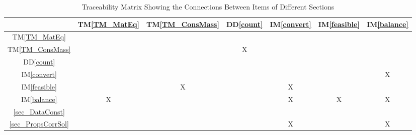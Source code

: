 \documentclass[12pt]{article}
\newcommand{\ddref}[1]{DD\ref{#1}}
\newcommand{\tmref}[1]{TM\ref{#1}}
\newcommand{\iref}[1]{IM\ref{#1}}
\begin{document}
\begin{table}[h!]
  \centering
  \begin{tabular}{|c|c|c|c|c|c|c|}
    \hline
                           & \tmref{TM_MatEq} & \tmref{TM_ConsMass} & \ddref{count} & \iref{convert} & \iref{feasible} & \iref{balance} \\
    \hline
    \tmref{TM_MatEq}       &                  &                     &               &                &                 &                \\ \hline
    \tmref{TM_ConsMass}    &                  &                     & X             &                &                 &                \\ \hline
    \ddref{count}          &                  &                     &               &                &                 &                \\ \hline
    \iref{convert}         &                  &                     &               &                &                 & X              \\ \hline
    \iref{feasible}        &                  & X                   &               & X              &                 &                \\ \hline
    \iref{balance}         & X                &                     &               & X              & X               & X              \\ \hline
    \ref{sec_DataConst}    &                  &                     &               &                &                 &                \\ \hline
    \ref{sec_PropsCorrSol} &                  &                     &               & X              &                 & X              \\ \hline
  \end{tabular}
  \caption{Traceability Matrix Showing the Connections Between Items of Different Sections}
  \label{Table:srs_trace}
\end{table}
\end{document}
